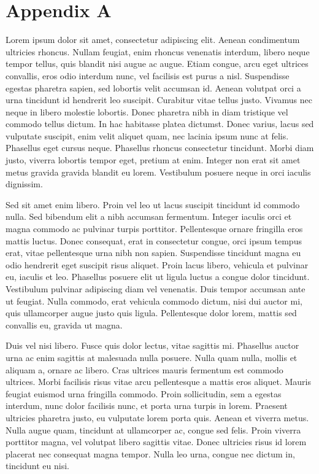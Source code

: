 \chapter{Appendix A}
\setcounter{page}{1}
\renewcommand{\thepage}{A-\arabic{page}}


Lorem ipsum dolor sit amet, consectetur adipiscing elit. Aenean condimentum ultricies rhoncus. Nullam feugiat, enim rhoncus venenatis interdum, libero neque tempor tellus, quis blandit nisi augue ac augue. Etiam congue, arcu eget ultrices convallis, eros odio interdum nunc, vel facilisis est purus a nisl. Suspendisse egestas pharetra sapien, sed lobortis velit accumsan id. Aenean volutpat orci a urna tincidunt id hendrerit leo suscipit. Curabitur vitae tellus justo. Vivamus nec neque in libero molestie lobortis. Donec pharetra nibh in diam tristique vel commodo tellus dictum. In hac habitasse platea dictumst. Donec varius, lacus sed vulputate suscipit, enim velit aliquet quam, nec lacinia ipsum nunc at felis. Phasellus eget cursus neque. Phasellus rhoncus consectetur tincidunt. Morbi diam justo, viverra lobortis tempor eget, pretium at enim. Integer non erat sit amet metus gravida gravida blandit eu lorem. Vestibulum posuere neque in orci iaculis dignissim.

Sed sit amet enim libero. Proin vel leo ut lacus suscipit tincidunt id commodo nulla. Sed bibendum elit a nibh accumsan fermentum. Integer iaculis orci et magna commodo ac pulvinar turpis porttitor. Pellentesque ornare fringilla eros mattis luctus. Donec consequat, erat in consectetur congue, orci ipsum tempus erat, vitae pellentesque urna nibh non sapien. Suspendisse tincidunt magna eu odio hendrerit eget suscipit risus aliquet. Proin lacus libero, vehicula et pulvinar eu, iaculis et leo. Phasellus posuere elit ut ligula luctus a congue dolor tincidunt. Vestibulum pulvinar adipiscing diam vel venenatis. Duis tempor accumsan ante ut feugiat. Nulla commodo, erat vehicula commodo dictum, nisi dui auctor mi, quis ullamcorper augue justo quis ligula. Pellentesque dolor lorem, mattis sed convallis eu, gravida ut magna.

Duis vel nisi libero. Fusce quis dolor lectus, vitae sagittis mi. Phasellus auctor urna ac enim sagittis at malesuada nulla posuere. Nulla quam nulla, mollis et aliquam a, ornare ac libero. Cras ultrices mauris fermentum est commodo ultrices. Morbi facilisis risus vitae arcu pellentesque a mattis eros aliquet. Mauris feugiat euismod urna fringilla commodo. Proin sollicitudin, sem a egestas interdum, nunc dolor facilisis nunc, et porta urna turpis in lorem. Praesent ultricies pharetra justo, eu vulputate lorem porta quis. Aenean et viverra metus. Nulla augue quam, tincidunt at ullamcorper ac, congue sed felis. Proin viverra porttitor magna, vel volutpat libero sagittis vitae. Donec ultricies risus id lorem placerat nec consequat magna tempor. Nulla leo urna, congue nec dictum in, tincidunt eu nisi.

